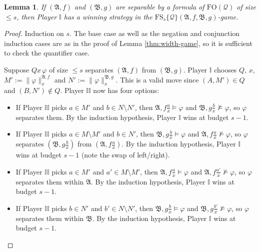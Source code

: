 \documentclass[10pt,a4paper]{amsart}
\newtheorem{lemma}{Lemma}
\begin{document}
\begin{lemma}\label{lem:model-game-sound}
    If $(\mathfrak{A},f)$ and $(\mathfrak{B},g)$ are separable by a formula of $\mathrm{FO}(\mathcal{Q})$ of size $\leq s$, then Player $\mathbb{I}$ has a winning strategy in the $\mathrm{FS}_s\{\mathcal{Q}\}(\mathfrak{A},f,\mathfrak{B},g)$-game.
\end{lemma}

\begin{proof}
    Induction on $s$. The base case as well as the negation and conjunction induction cases are as in the proof of Lemma \ref{thm:width-game}, so it is sufficient to check the quantifier case.

    Suppose $Qx\,\varphi$ of size $\leq s$ separates
    $(\mathfrak{A},f)$ from $(\mathfrak{B},g)$. Player $\mathbb{I}$ chooses
    $Q$, $x$, $M':=\|\varphi\|^{\mathfrak{A},f}_x$ and
    $N':=\|\varphi\|^{\mathfrak{B},g}_x$. This is a valid move since
    $(A,M')\in Q$ and $(B,N')\notin Q$. Player $\mathbb{II}$ now has four options:
    \begin{itemize}
        \item If Player $\mathbb{II}$ picks $a\in M'$ and
        $b\in N\setminus N'$, then
        $\mathfrak{A},f\frac{a}{x}\models\varphi$ and
        $\mathfrak{B},g\frac{b}{x}\not\models\varphi$, so $\varphi$
        separates them. By the induction hypothesis, Player $\mathbb{I}$ wins at budget
        $s-1$.
        \item If Player $\mathbb{II}$ picks $a\in M\setminus M'$ and
        $b\in N'$, then
        $\mathfrak{B},g\frac{b}{x}\models\varphi$ and
        $\mathfrak{A},f\frac{a}{x}\not\models\varphi$, so $\varphi$
        separates $(\mathfrak{B},g\frac{b}{x})$ from
        $(\mathfrak{A},f\frac{a}{x})$. By the induction hypothesis, Player $\mathbb{I}$
        wins at budget $s-1$ (note the swap of left/right).
        \item If Player $\mathbb{II}$ picks $a\in M'$ and
        $a'\in M\setminus M'$, then
        $\mathfrak{A},f\frac{a}{x}\models\varphi$ and
        $\mathfrak{A},f\frac{a'}{x}\not\models\varphi$, so $\varphi$
        separates them within $\mathfrak{A}$. By the induction hypothesis, Player
        $\mathbb{I}$ wins at budget $s-1$.
        \item If Player $\mathbb{II}$ picks $b\in N'$ and
        $b'\in N\setminus N'$, then
        $\mathfrak{B},g\frac{b}{x}\models\varphi$ and
        $\mathfrak{B},g\frac{b'}{x}\not\models\varphi$, so $\varphi$
        separates them within $\mathfrak{B}$. By the induction hypothesis, Player
        $\mathbb{I}$ wins at budget $s-1$.\qedhere
    \end{itemize}
\end{proof}
\end{document}
